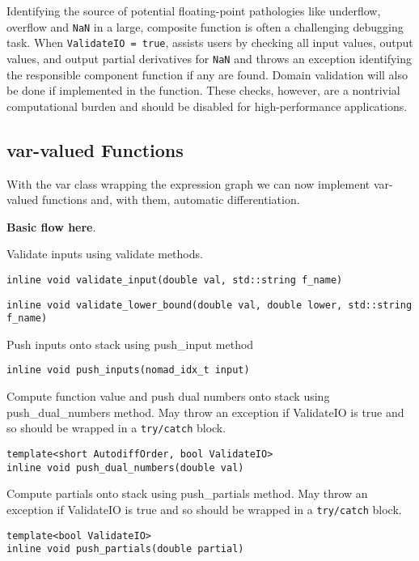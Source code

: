 Identifying the source of potential floating-point pathologies like
underflow, overflow and \verb|NaN| in a large, composite function
is often a challenging debugging task.  When \verb|ValidateIO = true|,
\nomad assists users by checking all input values, output values,
and output partial derivatives for \verb|NaN| and throws an
exception identifying the responsible component function if any
are found.  Domain validation will also be done if implemented in
the function.  These checks, however, are a nontrivial computational
burden and should be disabled for high-performance applications.

\subsection{var-valued Functions}

With the var class wrapping the expression graph we can now implement
var-valued functions and, with them, automatic differentiation.

\textbf{Basic flow here}.

Validate inputs using validate methods.

\begin{verbatim}
inline void validate_input(double val, std::string f_name)
\end{verbatim}

\begin{verbatim}
inline void validate_lower_bound(double val, double lower, std::string f_name)
\end{verbatim}

Push inputs onto stack using push\_input method

\begin{verbatim}
inline void push_inputs(nomad_idx_t input)
\end{verbatim}

Compute function value and push dual numbers onto stack
using push\_dual\_numbers method.  May throw an exception
if ValidateIO is true and so should be wrapped in a \verb|try/catch| block.

\begin{verbatim}
template<short AutodiffOrder, bool ValidateIO>
inline void push_dual_numbers(double val)
\end{verbatim}

Compute partials onto stack using push\_partials method.
May throw an exception if ValidateIO is true and so should be wrapped 
in a \verb|try/catch| block.

\begin{verbatim}
template<bool ValidateIO>
inline void push_partials(double partial)
\end{verbatim}

